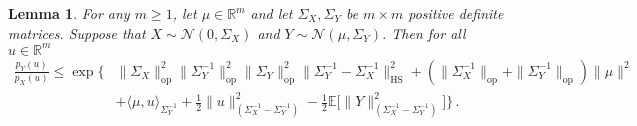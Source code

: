 \documentclass[11pt]{article}
\newtheorem{Lemma}[Theorem]{Lemma}
\numberwithin{equation}{section}
\begin{document}
\begin{Lemma}
\label{lemma-Gaussian-comparison}
    For any $m\geq 1$, let $\mu\in \mathbb R^m$ and let $\Sigma_X, \Sigma_Y$ be $m\times m$ positive definite matrices. Suppose that $X \sim \mathcal{N}(0,\Sigma_{X})$ and $Y \sim \mathcal{N}(\mu,\Sigma_{Y})$. Then for all $u\in \mathbb R^m$
    \begin{align*}
        \frac{  p_Y (u)  }{  p_X (u)  } \leq \exp \Big\{ & \| \Sigma_{X} \|_{\mathrm{op}}^2 \| \Sigma_{Y}^{-1} \|_{\mathrm{op}}^2 \| \Sigma_{Y} \|_{\mathrm{op}}^2 \| \Sigma_{Y}^{-1} - \Sigma_{X}^{-1} \|_{\mathrm{HS}}^2 + ( \| \Sigma_{X}^{-1} \|_{\mathrm{op}} + \| \Sigma_{Y}^{-1} \|_{\mathrm{op}} ) \| \mu \|^2 \\
        &+ \langle \mu, u \rangle_{\Sigma_{Y}^{-1}}  + \frac{1}{2} \| u \|^2_{ (\Sigma_{X}^{-1} - \Sigma_{Y}^{-1}) } - \frac{1}{2} \mathbb{E} \big[ \| Y \|^2_{ (\Sigma_{X}^{-1} - \Sigma_{Y}^{-1}) } \big] \Big\} \,.
    \end{align*}
\end{Lemma}
\end{document}
